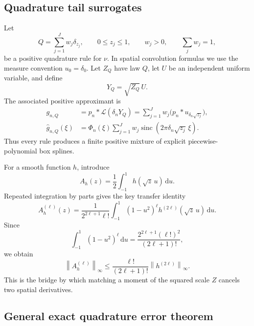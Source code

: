 \documentclass[11pt]{article}
\theoremstyle{definition}
\theoremstyle{remark}
\newcommand{\sinc}{\operatorname{sinc}}
\newcommand{\dd}{\,\mathrm d}
\newcommand{\norm}[1]{\left\lVert #1\right\rVert}
\begin{document}
\subsection{Quadrature tail surrogates}

Let
\begin{equation}
 Q=\sum_{j=1}^{J}w_j\delta_{z_j},
 \qquad
 0\le z_j\le1,
 \qquad w_j>0,
 \qquad \sum_jw_j=1,
 \label{eq:quadrature-Q}
\end{equation}
be a positive quadrature rule for $\nu$.  In spatial convolution formulas we use the
measure convention $u_0=\delta_0$.  Let $Z_Q$ have law $Q$, let $U$ be an
independent uniform variable, and define
\begin{equation}
 Y_Q=\sqrt{Z_Q}\,U.
 \label{eq:YQ}
\end{equation}
The associated positive approximant is
\begin{align}
 g_{n,Q}
 &=p_n*\mathcal L(\delta_nY_Q)
 =\sum_{j=1}^{J}w_j\bigl(p_n*u_{\delta_n\sqrt{z_j}}\bigr),
 \label{eq:gQ-spatial}\\
 \widehat g_{n,Q}(\xi)
 &=\Phi_n(\xi)\sum_{j=1}^{J}w_j
 \sinc(2\pi\delta_n\sqrt{z_j}\,\xi).
 \label{eq:gQ-fourier}
\end{align}
Thus every rule produces a finite positive mixture of explicit piecewise-polynomial
box splines.

For a smooth function $h$, introduce
\begin{equation}
 A_h(z)=\frac12\int_{-1}^{1}h(\sqrt z\,u)\dd u.
 \label{eq:Ah}
\end{equation}
Repeated integration by parts gives the key transfer identity
\begin{equation}
 A_h^{(\ell)}(z)
 =\frac{1}{2^{2\ell+1}\ell!}
 \int_{-1}^{1}(1-u^2)^\ell h^{(2\ell)}(\sqrt z\,u)\dd u.
 \label{eq:Ah-derivative}
\end{equation}
Since
\begin{equation}
 \int_{-1}^{1}(1-u^2)^\ell\dd u
 =\frac{2^{2\ell+1}(\ell!)^2}{(2\ell+1)!},
 \label{eq:beta-integral}
\end{equation}
we obtain
\begin{equation}
 \norm{A_h^{(\ell)}}_\infty
 \le\frac{\ell!}{(2\ell+1)!}\norm{h^{(2\ell)}}_\infty.
 \label{eq:Ah-bound}
\end{equation}
This is the bridge by which matching a moment of the squared scale $Z$ cancels two
spatial derivatives.

\subsection{General exact quadrature error theorem}
\end{document}
